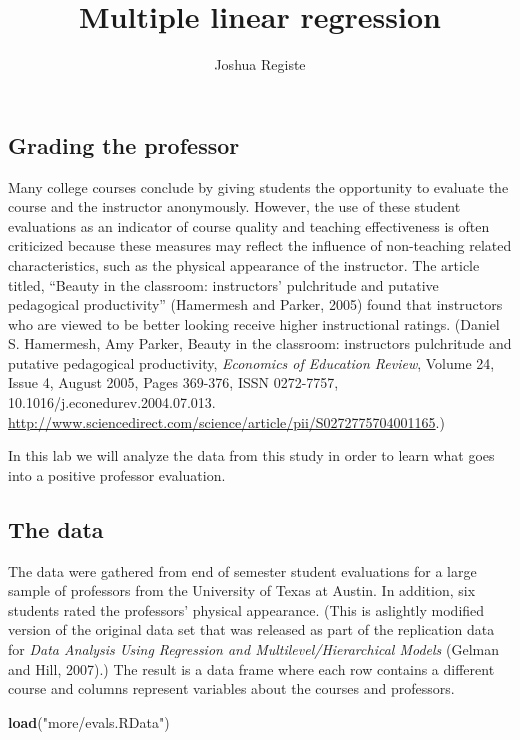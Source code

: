 \documentclass[
]{article}
\title{Multiple linear regression}
\author{Joshua Registe}
\date{}
\newenvironment{Shaded}{\begin{snugshade}}{\end{snugshade}}
\newcommand{\KeywordTok}[1]{\textcolor[rgb]{0.13,0.29,0.53}{\textbf{#1}}}
\newcommand{\NormalTok}[1]{#1}
\newcommand{\StringTok}[1]{\textcolor[rgb]{0.31,0.60,0.02}{#1}}
\begin{document}
\maketitle

\hypertarget{grading-the-professor}{%
\subsection{Grading the professor}\label{grading-the-professor}}

Many college courses conclude by giving students the opportunity to
evaluate the course and the instructor anonymously. However, the use of
these student evaluations as an indicator of course quality and teaching
effectiveness is often criticized because these measures may reflect the
influence of non-teaching related characteristics, such as the physical
appearance of the instructor. The article titled, ``Beauty in the
classroom: instructors' pulchritude and putative pedagogical
productivity'' (Hamermesh and Parker, 2005) found that instructors who
are viewed to be better looking receive higher instructional ratings.
(Daniel S. Hamermesh, Amy Parker, Beauty in the classroom: instructors
pulchritude and putative pedagogical productivity, \emph{Economics of
Education Review}, Volume 24, Issue 4, August 2005, Pages 369-376, ISSN
0272-7757, 10.1016/j.econedurev.2004.07.013.
\url{http://www.sciencedirect.com/science/article/pii/S0272775704001165}.)

In this lab we will analyze the data from this study in order to learn
what goes into a positive professor evaluation.

\hypertarget{the-data}{%
\subsection{The data}\label{the-data}}

The data were gathered from end of semester student evaluations for a
large sample of professors from the University of Texas at Austin. In
addition, six students rated the professors' physical appearance. (This
is aslightly modified version of the original data set that was released
as part of the replication data for \emph{Data Analysis Using Regression
and Multilevel/Hierarchical Models} (Gelman and Hill, 2007).) The result
is a data frame where each row contains a different course and columns
represent variables about the courses and professors.

\begin{Shaded}
\begin{Highlighting}[]
\KeywordTok{load}\NormalTok{(}\StringTok{"more/evals.RData"}\NormalTok{)}
\end{Highlighting}
\end{Shaded}
\end{document}
